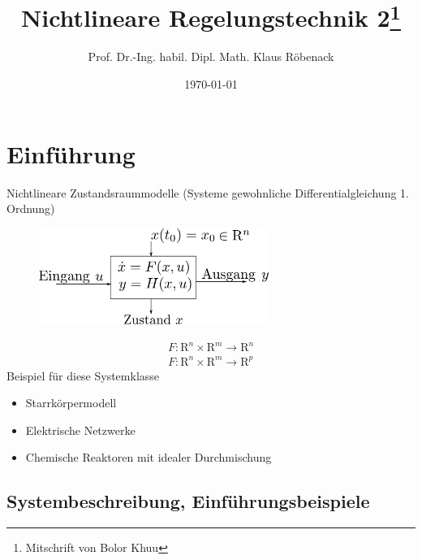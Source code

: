 \documentclass[ngerman]{tudscrreprt}
\begin{document}
 \department{}   \title{Nichtlineare Regelungstechnik 2{\footnote{Mitschrift von Bolor Khuu}}
}
\author{Prof. Dr.-Ing. habil. Dipl. Math. Klaus Röbenack}
\date{\today}
\maketitle
\tableofcontents
\newpage
\chapter{Einführung}
Nichtlineare Zustandsraummodelle (Systeme gewohnliche Differentialgleichung 1. Ordnung)\\
\begin{figure}[H]
\centering
\def\svgwidth{200pt} 
  \includegraphics[width=7.5cm]{image1.pdf}
\end{figure}
\begin{equation*}
\begin{matrix}
F:\mathrm{R}^n \times \mathrm{R}^m \to \mathrm{R}^n \\ 
F:\mathrm{R}^n \times \mathrm{R}^m \to \mathrm{R}^p
\end{matrix}
\end{equation*}
Beispiel für diese Systemklasse 
\begin{itemize}
\item Starrkörpermodell
\item Elektrische Netzwerke
\item Chemische Reaktoren mit idealer Durchmischung
\end{itemize}
\section{Systembeschreibung, Einführungsbeispiele}
\end{document}
